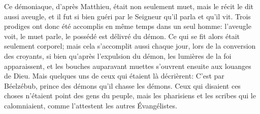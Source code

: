 Ce démoniaque, d’après Matthieu, était non seulement muet,
	mais le récit le dit aussi aveugle,
	et il fut si bien guéri par le Seigneur qu’il parla et qu’il vit.
Trois prodiges ont donc été accomplis en même temps dans un seul homme:
	l’aveugle voit, le muet parle, le possédé est délivré du démon.
Ce qui se fit alors était seulement corporel;
	mais cela s’accomplit aussi chaque jour, lors de la conversion des croyants,
	si bien qu’après l’expulsion du démon, les lumières de la foi apparaissent,
	et les bouches auparavant muettes s’ouvrent ensuite aux louanges de Dieu.
Mais quelques uns de ceux qui étaient là décrièrent:
	C’est par Béelzébub, prince des démons qu’il chasse les démons.
Ceux qui disaient ces choses n’étaient point des gens du peuple,
	mais les pharisiens et les scribes qui le calomniaient,
	comme l’attestent les autres Évangélistes.
